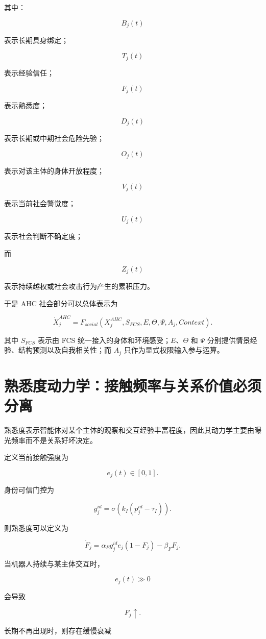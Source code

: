 其中：

\[
B_j(t)
\]

表示长期具身绑定；

\[
T_j(t)
\]

表示经验信任；

\[
F_j(t)
\]

表示熟悉度；

\[
D_j(t)
\]

表示长期或中期社会危险先验；

\[
O_j(t)
\]

表示对该主体的身体开放程度；

\[
V_j(t)
\]

表示当前社会警觉度；

\[
U_j(t)
\]

表示社会判断不确定度；

而

\[
Z_j(t)
\]

表示持续越权或社会攻击行为产生的累积压力。

于是 AHC 社会部分可以总体表示为

\[
\boxed{
\dot X_j^{AHC}
=
F_{social}
\left(
X_j^{AHC},
S_{FCS},
E,
\Theta,
\Psi,
A_j,
Context
\right).
}
\]

其中 $S_{FCS}$ 表示由 FCS 统一接入的身体和环境感受；$E$、$\Theta$ 和 $\Psi$ 分别提供情景经验、结构预测以及自我相关性；而 $A_j$ 只作为显式权限输入参与运算。


\section{熟悉度动力学：接触频率与关系价值必须分离}

熟悉度表示智能体对某个主体的观察和交互经验丰富程度，因此其动力学主要由曝光频率而不是关系好坏决定。

定义当前接触强度为

\[
e_j(t)\in[0,1].
\]

身份可信门控为

\[
g_j^{id}
=
\sigma
\left(
k_I
\left(
p_j^{id}-\tau_I
\right)
\right).
\]

则熟悉度可以定义为

\[
\boxed{
\dot F_j
=
\alpha_F
g_j^{id}
e_j
(1-F_j)
-
\beta_FF_j.
}
\]

当机器人持续与某主体交互时，

\[
e_j(t)\gg0
\]

会导致

\[
F_j\uparrow.
\]

长期不再出现时，则存在缓慢衰减

